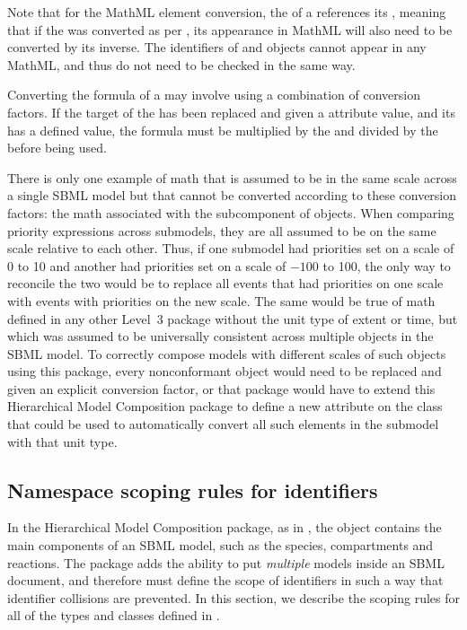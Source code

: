 Note that for the MathML  element conversion, the
 of a \Reaction references its \KineticLaw, meaning that if
the \KineticLaw was converted as per , its
appearance in MathML will also need to be converted by its inverse.  The
identifiers of \AssignmentRule and \RateRule objects cannot appear in
any MathML, and thus do not need to be checked in the same way.

Converting the formula of a \RateRule may involve using a combination of
conversion factors.  If the target of the \RateRule has been replaced
and given a  attribute value, and its \Submodel
has a defined  value, the formula must be
multiplied by the  and divided by the
 before being used.

There is only one example of math that is assumed to be in the same
scale across a single SBML model but that cannot be converted according
to these conversion factors: the math associated with the \Priority
subcomponent of \Event objects.  When comparing priority expressions
across submodels, they are all assumed to be on the same scale relative
to each other.  Thus, if one submodel had priorities set on a scale of 0
to 10 and another had priorities set on a scale of $-100$ to 100, the
only way to reconcile the two would be to replace all events that had
priorities on one scale with events with priorities on the new scale.
The same would be true of math defined in any other Level~3 package
without the unit type of extent or time, but which was assumed to be
universally consistent across multiple objects in the SBML model.  To
correctly compose models with different scales of such objects using
this package, every nonconformant object would need to be replaced and
given an explicit conversion factor, or that package would have to
extend this Hierarchical Model Composition package to define a new
attribute on the \Submodel class that could be used to automatically
convert all such elements in the submodel with that unit type.


\clearpage

\subsection{Namespace scoping rules for identifiers}
\label{namespaces}

In the Hierarchical Model Composition package, as in \sbmlthreecore,
the \Model object contains the main components of an
SBML model, such as the species, compartments and reactions.  The
package adds the ability to put \emph{multiple} models inside an SBML
document, and therefore must define the scope of identifiers in such a
way that identifier collisions are prevented.  In this section, we
describe the scoping rules for all of the types and classes defined in
.

